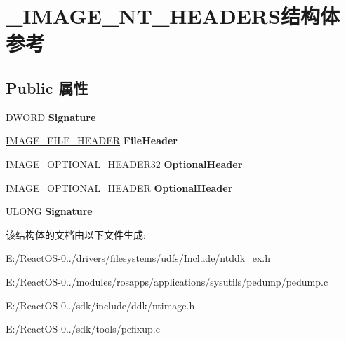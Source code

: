 \hypertarget{struct___i_m_a_g_e___n_t___h_e_a_d_e_r_s}{}\section{\+\_\+\+I\+M\+A\+G\+E\+\_\+\+N\+T\+\_\+\+H\+E\+A\+D\+E\+R\+S结构体 参考}
\label{struct___i_m_a_g_e___n_t___h_e_a_d_e_r_s}
\subsection*{Public 属性}
\begin{DoxyCompactItemize}
\item 
\mbox{\label{struct___i_m_a_g_e___n_t___h_e_a_d_e_r_s_a0fab671e499d3d3f47db0a30b8369f80}} 
D\+W\+O\+RD {\bfseries Signature}
\item 
\mbox{\label{struct___i_m_a_g_e___n_t___h_e_a_d_e_r_s_ab8aa7ee8ecc7b35fecc1b99b57fc9817}} 
\hyperlink{struct___i_m_a_g_e___f_i_l_e___h_e_a_d_e_r}{I\+M\+A\+G\+E\+\_\+\+F\+I\+L\+E\+\_\+\+H\+E\+A\+D\+ER} {\bfseries File\+Header}
\item 
\mbox{\label{struct___i_m_a_g_e___n_t___h_e_a_d_e_r_s_aefe27165bea8e56d7e44f114891f3ce8}} 
\hyperlink{struct___i_m_a_g_e___o_p_t_i_o_n_a_l___h_e_a_d_e_r}{I\+M\+A\+G\+E\+\_\+\+O\+P\+T\+I\+O\+N\+A\+L\+\_\+\+H\+E\+A\+D\+E\+R32} {\bfseries Optional\+Header}
\item 
\mbox{\label{struct___i_m_a_g_e___n_t___h_e_a_d_e_r_s_aefe27165bea8e56d7e44f114891f3ce8}} 
\hyperlink{struct___i_m_a_g_e___o_p_t_i_o_n_a_l___h_e_a_d_e_r}{I\+M\+A\+G\+E\+\_\+\+O\+P\+T\+I\+O\+N\+A\+L\+\_\+\+H\+E\+A\+D\+ER} {\bfseries Optional\+Header}
\item 
\mbox{\label{struct___i_m_a_g_e___n_t___h_e_a_d_e_r_s_a84bebee456d0d84c9df4ccec69edb5c9}} 
U\+L\+O\+NG {\bfseries Signature}
\end{DoxyCompactItemize}


该结构体的文档由以下文件生成\+:\begin{DoxyCompactItemize}
\item 
E\+:/\+React\+O\+S-\/0../drivers/filesystems/udfs/\+Include/ntddk\+\_\+ex.\+h\item 
E\+:/\+React\+O\+S-\/0../modules/rosapps/applications/sysutils/pedump/pedump.\+c\item 
E\+:/\+React\+O\+S-\/0../sdk/include/ddk/ntimage.\+h\item 
E\+:/\+React\+O\+S-\/0../sdk/tools/pefixup.\+c\end{DoxyCompactItemize}
